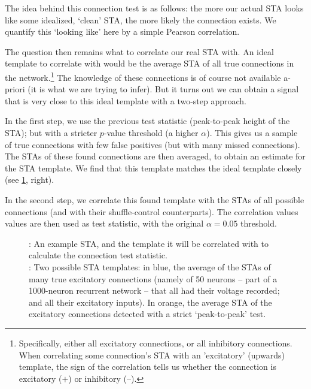 The idea behind this connection test is as follows: the more our actual STA looks like some idealized, `clean' STA, the more likely the connection exists. We quantify this `looking like' here by a simple Pearson correlation.

The question then remains what to correlate our real STA with. An ideal template to correlate with would be the average STA of all true connections in the network.\footnote
{Specifically, either all excitatory connections, or all inhibitory connections.
When correlating some connection's STA with an 'excitatory'  (upwards) template, the sign of the correlation tells us whether the connection is excitatory ($+$) or inhibitory ($–$).}
The knowledge of these connections is of course not available a-priori (it is what we are trying to infer). But it turns out we can obtain a signal that is very close to this ideal template with a two-step approach.

In the first step, we use the previous test statistic (peak-to-peak height of the STA); but with a stricter $p$-value threshold (a higher $α$). This gives us a sample of true connections with few false positives (but with many missed connections). The STAs of these found connections are then averaged, to obtain an estimate for the STA template. We find that this template matches the ideal template closely (see \cref{fig:corr}, right).

In the second step, we correlate this found template with the STAs of all possible connections (and with their shuffle-control counterparts). The correlation values values are then used as test statistic, with the original $α = 0.05$ threshold.


\begin{figure}
    {\Left: An example STA, and the template it will be correlated with to calculate the connection test statistic.\\
    \Right: Two possible STA templates: in blue, the average of the STAs of many true excitatory connections (namely of 50 neurons -- part of a 1000-neuron recurrent network -- that all had their voltage recorded; and all their excitatory inputs).
    In orange, the average STA of the excitatory connections detected with a strict `peak-to-peak' test.}
    \label{fig:corr}
\end{figure}

